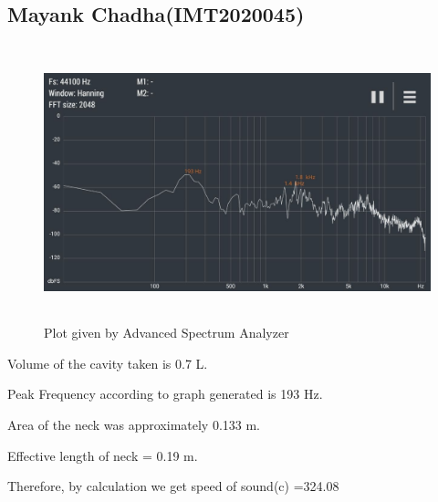 \documentclass[11pt]{scrartcl} %
\begin{document}
\subsection{Mayank Chadha(IMT2020045)}
\begin{figure}[h] %
	\centering
	\includegraphics[width=12cm, height=8cm]{700ml.jpg} %
	\caption {Plot given by Advanced Spectrum Analyzer}
\end{figure}
Volume of the cavity taken is 0.7 L.\par
Peak Frequency according to graph generated is 193 Hz.\par
Area of the neck was approximately 0.133 m.\par
Effective length of neck = 0.19 m.\par
Therefore, by calculation we get speed of sound(c) =324.08
\end{document}
